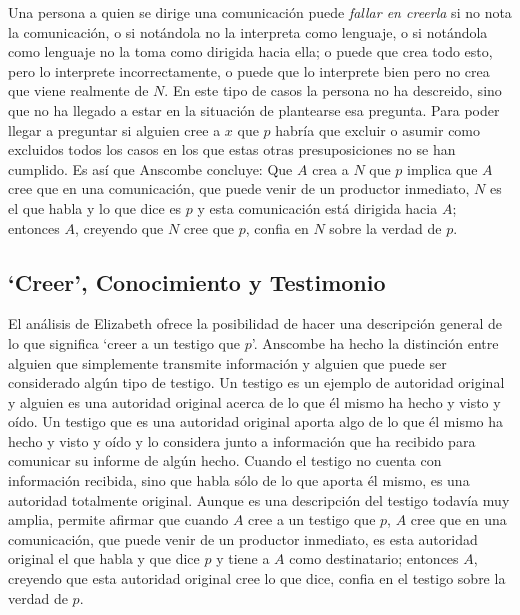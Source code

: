Una persona a quien se dirige una comunicación puede \emph{fallar en creerla} si
no nota la comunicación, o si notándola no la interpreta como lenguaje, o si
notándola como lenguaje no la toma como dirigida hacia ella; o puede que crea
todo esto, pero lo interprete incorrectamente, o puede que lo interprete bien
pero no crea que viene realmente de $N$. En este tipo de casos la persona no ha
descreido, sino que no ha llegado a estar en la situación de plantearse esa
pregunta. Para poder llegar a preguntar si alguien cree a $x$ que $p$ habría que
excluir o asumir como excluidos todos los casos en los que estas otras
presuposiciones no se han cumplido. Es así que Anscombe concluye:
Que $A$ crea a $N$ que $p$ implica que $A$ cree que en una comunicación, que puede
venir de un productor inmediato, $N$ es el que habla y lo que dice es $p$ y esta
comunicación está dirigida hacia $A$; entonces $A$, creyendo que $N$ cree que
$p$, confia en $N$ sobre la verdad de $p$.

\subsection{`Creer', Conocimiento y Testimonio}
El análisis de Elizabeth ofrece la posibilidad de hacer una descripción general
de lo que significa `creer a un testigo que $p$'. Anscombe ha hecho la
distinción entre alguien que simplemente transmite información y alguien que
puede ser considerado algún tipo de testigo. Un testigo es un ejemplo de
autoridad original y alguien es una autoridad original acerca de lo que él mismo
ha hecho y visto y oído. Un testigo que es una autoridad original aporta algo de
lo que él mismo ha hecho y visto y oído y lo considera junto a información que
ha recibido para comunicar su informe de algún hecho. Cuando el testigo no
cuenta con información recibida, sino que habla sólo de lo que aporta él mismo,
es una autoridad totalmente original. Aunque es una descripción del testigo
todavía muy amplia, permite afirmar que cuando $A$ cree a un testigo que $p$,
$A$ cree que en una comunicación, que puede venir de un productor inmediato, es
esta autoridad original el que habla y que dice $p$ y tiene a $A$ como
destinatario; entonces $A$, creyendo que esta autoridad original cree lo que
dice, confia en el testigo sobre la verdad de $p$.

